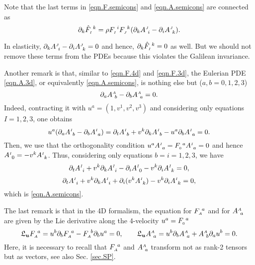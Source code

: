 \documentclass[
10pt, %
a4paper, %
oneside, %
headinclude,footinclude, %
BCOR5mm, %
]{scrartcl}
\newcommand{\Lie}{\mathfrak{L}}
\newcommand{\pd}{\partial}
\newcommand{\F}[2]{F^{\ #1}_{\mathsmaller#2}}
\newcommand{\hatF}[2]{\hat{F}^{\ #1}_{\mathsmaller#2}}
\newcommand{\A}[2]{A^{\mathsmaller#1}_{\ #2}}
\begin{document}
\begin{remark}\label{rem.div.curl}
Note that the last terms in \eqref{eqn.F.semicons} and \eqref{eqn.A.semicons} are 
connected as
\begin{equation}
\pd_k \hatF{k}{I} = \rho \F{i}{I}\F{k}{J}(\pd_k \A{J}{i} - \pd_i \A{J}{k}).
\end{equation}
\end{remark}


\begin{remark}\label{rem.galilean.inv} In elasticity, $ \pd_k \A{J}{i} - \pd_i \A{J}{k} = 0 $ and hence, $ 
\pd_k\hatF{k}{I} = 0 $ as well. But we should not remove these terms from the PDEs because this 
violates the 
Galilean invariance.
\end{remark}


\begin{remark}\label{rem.curl.A} Another remark is that, similar to \eqref{eqn.F.4d} and \eqref{eqn.F.3d}, the 
Eulerian PDE \eqref{eqn.A.3d}, or equivalently \eqref{eqn.A.semicons}, is nothing else but ($ 
a,b=0,1,2,3 $)
\begin{equation}\label{eqn.A.4d}
\pd_a \A{A}{b} - \pd_b \A{A}{a} = 0.
\end{equation}
Indeed, contracting it with $ u^a = (1,v^1,v^2,v^3) $ and considering only equations $ I=1,2,3 $, 
one obtains
\begin{equation}
u^a(\pd_a \A{I}{b} - \pd_b \A{I}{a}) = \pd_t \A{I}{b} + v^k\pd_k \A{I}{b} - u^a\pd_b \A{I}{a} = 0.
\end{equation}
Then, we use that the orthogonality condition $ u^a\A{I}{a} = \F{a}{0}\A{I}{a} = 0 $ and hence $ \A{I}{0} = -v^k \A{I}{k} $.
Thus, considering only equations $ b=i=1,2,3 $, we have
\begin{equation}
\pd_t \A{I}{i} + v^k\pd_k \A{I}{i} - \pd_i \A{I}{0} - v^k\pd_i \A{I}{k} = 0,
\end{equation}
\begin{equation}
\pd_t \A{I}{i} + v^k\pd_k \A{I}{i} + \pd_i (v^k \A{I}{k}) - v^k\pd_i \A{I}{k} = 0,
\end{equation}
which is \eqref{eqn.A.semicons}.
\end{remark}


\begin{remark} The last remark is that in the 4D formalism, the equation for $ \F{a}{A} $ and for $ 
\A{A}{a} $ are given by the Lie derivative along the 4-velocity $ u^a = \F{a}{0}$
\begin{equation}
\Lie_{\bm{u}} \F{a}{A} = u^b\pd_b \F{a}{A} - \F{b}{A}\pd_b u^a = 0, \qquad 
\Lie_{\bm{u}} \A{A}{a} = u^b \pd_b \A{A}{a} + \A{A}{b}\pd_a u^b = 0.
\end{equation}
Here, it is necessary to recall that $ \F{a}{A} $ and $ \A{A}{a} $ transform not as rank-2 tensors 
but as vectors, see also Sec. \ref{sec.SP}.
\end{remark}
\end{document}
